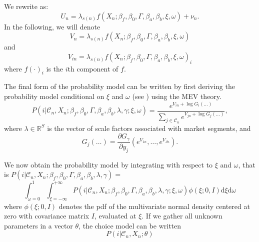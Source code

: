 \documentclass[12pt]{memoir}
\begin{document}
We rewrite  as:
      \begin{equation}
      U_{n} = \lambda_{s(n)} f(X_{n};\beta_f,\beta_0,\Gamma,\beta_a,\beta_b,\xi,\omega) + \nu_{n}.
      \end{equation}
      In the following, we will denote
      \begin{equation}
      \label{eq:vn}
      V_n = \lambda_{s(n)} f(X_{n};\beta_f,\beta_0,\Gamma,\beta_a,\beta_b,\xi,\omega)
      \end{equation}
      and
      \begin{equation}
      \label{eq:vni}
      V_{in} = \lambda_{s(n)} f(X_{n};\beta_f,\beta_0,\Gamma,\beta_a,\beta_b,\xi,\omega)_i
      \end{equation}
      where $f(\cdot)_i$ is the $i$\/th component of $f$.

      The final form of the probability model can be written by first
      deriving the probability model conditional on $\xi$ and $\omega$ (see
      \cite{McFa78}) using the MEV theory.
      \begin{equation}
      \label{eq:proba-gev}
      P(i|\mathcal{C}_n, X_n; \beta_f,\beta_0,\Gamma,\beta_a,\beta_b,\lambda,\gamma;\xi,\omega) = 
      \frac{e^{V_{in} + \log
         G_i(\ldots)}}{\sum_{j\in\mathcal{C}_n} e^{V_{jn}  + \log G_j(\ldots)}},
      \end{equation}
      where $\lambda \in \mathbb{R}^S$ is the vector of scale factors
      associated with market segments,   and
      \begin{equation}
      G_j(\ldots) = \frac{\partial G_\gamma}{\partial y_j}(e^{V_{1n}},\ldots,e^{V_{Jn}}).
      \end{equation}

      We now obtain the probability model by integrating with respect
to $\xi$ and $\omega$, that is $P(i|\mathcal{C}_n, X_n;
\beta_f,\beta_0,\Gamma,\beta_a,\beta_b,\lambda,\gamma) = $
      \begin{equation}
      \label{eq:full-proba}
      \int_{\omega=0}^1 \int_{\xi=-\infty}^{+\infty}
       P(i|\mathcal{C}_n, X_n;
\beta_f,\beta_0,\Gamma,\beta_a,\beta_b,\lambda,\gamma;\xi,\omega)
\phi(\xi;0,I)  \text{d}\xi  \text{d}\omega
       \end{equation}
      where $\phi(\xi;0,I)$ denotes the pdf of the multivariate  normal   density
centered at zero with covariance matrix $I$, evaluated at $\xi$.  If we gather all unknown parameters in a
vector $\theta$, the choice model  can be written
\begin{equation}
\label{eq:theChoiceModel}
      P(i|\mathcal{C}_n, X_n; \theta)
\end{equation}
        
\end{document}
